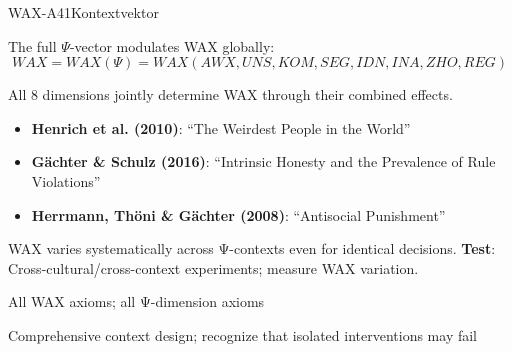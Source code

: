 \begin{axiomspec}{WAX-A41}{Kontextvektor}

The full $\Psi$-vector modulates WAX globally:
\begin{equation}
WAX = WAX(\Psi) = WAX(AWX, UNS, KOM, SEG, IDN, INA, ZHO, REG)
\end{equation}

All 8 dimensions jointly determine WAX through their combined effects.

\begin{itemize}
\item \textbf{Henrich et al. (2010)}: ``The Weirdest People in the World''
\item \textbf{Gächter \& Schulz (2016)}: ``Intrinsic Honesty and the Prevalence of Rule Violations''
\item \textbf{Herrmann, Thöni \& Gächter (2008)}: ``Antisocial Punishment''
\end{itemize}

WAX varies systematically across Ψ-contexts even for identical decisions.
\textbf{Test}: Cross-cultural/cross-context experiments; measure WAX variation.

All WAX axioms; all Ψ-dimension axioms

Comprehensive context design; recognize that isolated interventions may fail

\end{axiomspec}


